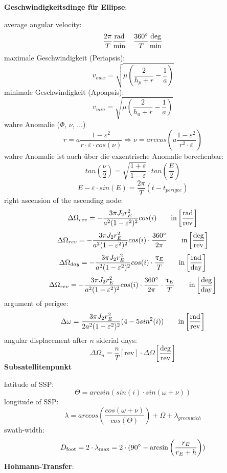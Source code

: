 \documentclass[a4paper,10pt]{article}
\newcommand{\f}{\textbf}
\begin{document}
\noindent \f{Geschwindigkeitsdinge für Ellipse}:\\
\vspace*{3pt}

\noindent average angular velocity:
\[ \frac{2\pi}{T} \frac{\text{rad}}{\text{min}} ~~~ \frac{360\degree}{T} \frac{\text{deg}}{\text{min}}\]
maximale Geschwindigkeit (Periapsis):
\[v_{max} = \sqrt{\mu\left(\frac{2}{h_p+r} -\frac{1}{a}\right)}\]
minimale Geschwindigkeit (Apoapsis):
\[v_{min} = \sqrt{\mu\left(\frac{2}{h_a+r} -\frac{1}{a}\right)}\]
wahre Anomalie ($\Phi$, $\nu$, ...)
\[r = a\frac{1-\varepsilon^2}{r\cdot \varepsilon \cdot cos(\nu)} \Rightarrow \nu = arccos\left(a\frac{1-\varepsilon^2}{r^2\cdot \varepsilon}\right)\]
wahre Anomalie ist auch über die exzentrische Anomalie berechenbar:
\[tan\left(\frac{\nu}{2}\right) = \sqrt{\frac{1+\varepsilon}{1-\varepsilon}}\cdot tan\left(\frac{E}{2}\right)\]
\[E - \varepsilon \cdot sin(E) = \frac{2\pi}{T}(t-t_{perigee})\]
right ascension of the ascending node:
\[\Delta \Omega_{rev} = -\frac{3\pi J_2r_E^2}{a^2(1-\varepsilon^2)^2}cos(i) \text{\qquad  in} \left[\frac{\text{rad}}{\text{rev}}\right]\]
\[\Delta \Omega_{rev} = -\frac{3\pi J_2r_E^2}{a^2(1-\varepsilon^2)^2}cos(i) \cdot \frac{360^{\circ}}{2\pi} \text{\qquad  in} \left[\frac{\text{deg}}{\text{rev}}\right]\]
\[\Delta \Omega_{day} = -\frac{3\pi J_2r_E^2}{a^2(1-\varepsilon^2)^2}cos(i) \cdot \frac{\uptau_E}{T} \text{\qquad  in} \left[\frac{\text{rad}}{\text{day}}\right]\]
\[\Delta \Omega_{rev} = -\frac{3\pi J_2r_E^2}{a^2(1-\varepsilon^2)^2}cos(i) \cdot \frac{360^{\circ}}{2\pi}\cdot \frac{\uptau_E}{T} \text{\qquad  in} \left[\frac{\text{deg}}{\text{day}}\right]\]
argument of perigee:
\[\Delta \omega = \frac{3\pi J_2r_E^2}{2a^2(1-\varepsilon^2)^2}(4-5sin^2(i))\text{\qquad  in} \left[\frac{\text{rad}}{\text{rev}}\right]\]
angular displacement after $n$ siderial days:
\[ \Delta\Omega_n = \frac{n}{T} [\text{rev}] \cdot \Delta\Omega \left[\frac{\text{deg}}{\text{rev}}\right]\]
\f{Subsatellitenpunkt}\\
\vspace*{5pt}

\noindent latitude of SSP: 
\[\Theta = arcsin(sin(i)\cdot sin(\omega + \nu))\]
longitude of SSP: 
\[\lambda = arccos\left(\frac{cos(\omega + \nu)}{cos(\Theta)}\right) + \Omega + \lambda_{greenwich}\]
swath-width:
\[ D_\text{foot} = 2\cdot \lambda_\text{max} = 2\cdot (90\degree - \arcsin\left(\frac{r_E}{r_E + h}\right)) \]
\f{Hohmann-Transfer}:\\
\vspace*{5pt}
\end{document}
